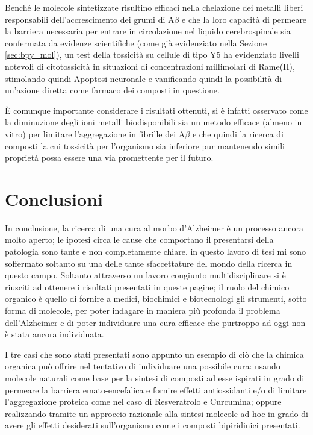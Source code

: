 \documentclass[a4paper, 12pt]{article}
\begin{document}
Benché le molecole sintetizzate risultino efficaci nella chelazione dei metalli liberi responsabili dell’accrescimento dei grumi di A$\beta$ e che la loro capacità di permeare la barriera necessaria per entrare in circolazione nel liquido cerebrospinale sia confermata da evidenze scientifiche (come già evidenziato nella Sezione \ref{sec:bpy_mol}), un test della tossicità su cellule di tipo Y5 ha evidenziato livelli notevoli di citotossicità in situazioni di concentrazioni millimolari di Rame(II), stimolando quindi Apoptosi neuronale e vanificando quindi la possibilità di un'azione diretta come farmaco dei composti in questione.

È comunque importante considerare i risultati ottenuti, si è infatti osservato come la diminuzione degli ioni metalli biodisponibili sia un metodo efficace (almeno in vitro) per limitare l'aggregazione in fibrille dei A$\beta$ e che quindi la ricerca di composti la cui tossicità per l'organismo sia inferiore pur mantenendo simili proprietà possa essere una via promettente per il futuro. \cite{ji_strategic_2017}

\section{Conclusioni}
In conclusione, la ricerca di una cura al morbo d'Alzheimer è un processo ancora molto aperto; le ipotesi circa le cause che comportano il presentarsi della patologia sono tante e non completamente chiare. in questo lavoro di tesi mi sono soffermato soltanto su una delle tante sfaccettature del mondo della ricerca in questo campo. Soltanto attraverso un lavoro congiunto multidisciplinare si è riusciti ad ottenere i risultati presentati in queste pagine; il ruolo del chimico organico è quello di fornire a medici, biochimici e biotecnologi gli strumenti, sotto forma di molecole, per poter indagare in maniera più profonda il problema dell'Alzheimer e di poter individuare una cura efficace che purtroppo ad oggi non è stata ancora individuata.

I tre casi che sono stati presentati sono appunto un esempio di ciò che la chimica organica può offrire nel tentativo di individuare una possibile cura: usando molecole naturali come base per la sintesi di composti ad esse ispirati in grado di permeare la barriera emato-encefalica e fornire effetti antiossidanti e/o di limitare l'aggregazione proteica come nel caso di Resveratrolo e Curcumina; oppure realizzando tramite un approccio razionale alla sintesi molecole ad hoc in grado di avere gli effetti desiderati sull'organismo come i composti bipiridinici presentati.
\end{document}

